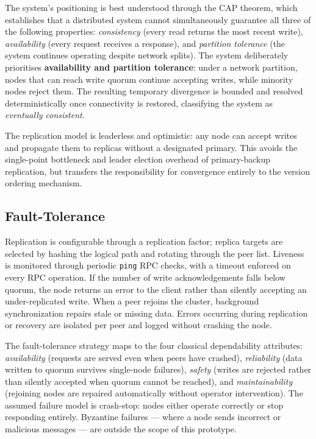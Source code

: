 \documentclass{scrartcl}
\begin{document}
The system's positioning is best understood through the CAP theorem, which establishes that a distributed system cannot simultaneously guarantee all three of the following properties: \emph{consistency} (every read returns the most recent write), \emph{availability} (every request receives a response), and \emph{partition tolerance} (the system continues operating despite network splits). The system deliberately prioritises \textbf{availability and partition tolerance}: under a network partition, nodes that can reach write quorum continue accepting writes, while minority nodes reject them. The resulting temporary divergence is bounded and resolved deterministically once connectivity is restored, classifying the system as \emph{eventually consistent}.

The replication model is leaderless and optimistic: any node can accept writes and propagate them to replicas without a designated primary. This avoids the single-point bottleneck and leader election overhead of primary-backup replication, but transfers the responsibility for convergence entirely to the version ordering mechanism.

\subsection{Fault-Tolerance}\label{fault-tolerance}

Replication is configurable through a replication factor; replica targets are selected by hashing the logical path and rotating through the peer list. Liveness is monitored through periodic \texttt{ping} RPC checks, with a timeout enforced on every RPC operation. If the number of write acknowledgements falls below quorum, the node returns an error to the client rather than silently accepting an under-replicated write. When a peer rejoins the cluster, background synchronization repairs stale or missing data. Errors occurring during replication or recovery are isolated per peer and logged without crashing the node.

The fault-tolerance strategy maps to the four classical dependability attributes: \emph{availability} (requests are served even when peers have crashed), \emph{reliability} (data written to quorum survives single-node failures), \emph{safety} (writes are rejected rather than silently accepted when quorum cannot be reached), and \emph{maintainability} (rejoining nodes are repaired automatically without operator intervention). The assumed failure model is crash-stop: nodes either operate correctly or stop responding entirely. Byzantine failures --- where a node sends incorrect or malicious messages --- are outside the scope of this prototype.
\end{document}
